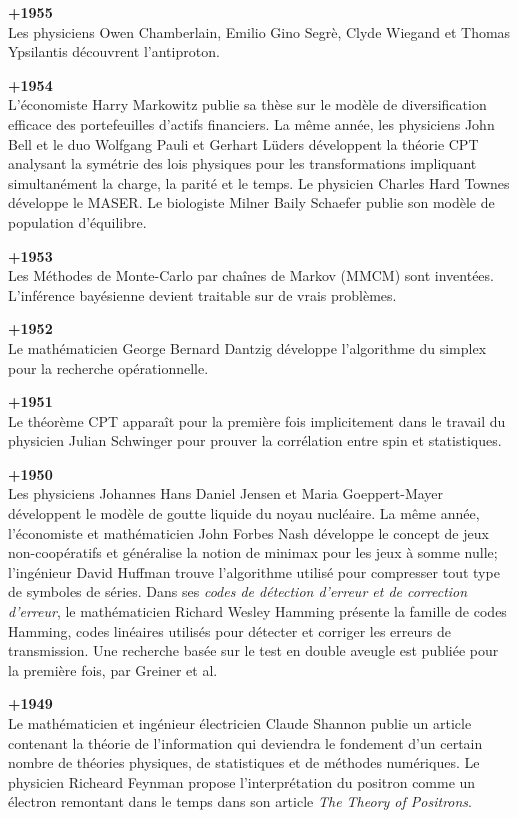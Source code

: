 \textbf{+1955}\\
Les physiciens Owen Chamberlain, Emilio Gino Segrè, Clyde Wiegand et Thomas Ypsilantis découvrent l'antiproton.

\textbf{+1954}\\
L'économiste Harry Markowitz publie sa thèse sur le modèle de diversification efficace des portefeuilles d'actifs financiers. La même année, les physiciens John Bell et le duo Wolfgang Pauli et Gerhart Lüders développent la théorie CPT analysant la symétrie des lois physiques pour les transformations impliquant simultanément la charge, la parité et le temps. Le physicien Charles Hard Townes développe le MASER. Le biologiste Milner Baily Schaefer publie son modèle de population d'équilibre.

\textbf{+1953}\\
Les Méthodes de Monte-Carlo par chaînes de Markov (MMCM) sont inventées. L'inférence bayésienne devient traitable sur de vrais problèmes.


\textbf{+1952}\\
Le mathématicien George Bernard Dantzig développe l'algorithme du simplex pour la recherche opérationnelle.

\textbf{+1951}\\
Le théorème CPT apparaît pour la première fois implicitement dans le travail du physicien Julian Schwinger pour prouver la corrélation entre spin et statistiques.

\textbf{+1950}\\
Les physiciens Johannes Hans Daniel Jensen et Maria Goeppert-Mayer développent le modèle de goutte liquide du noyau nucléaire. La même année, l'économiste et mathématicien John Forbes Nash développe le concept de jeux non-coopératifs et généralise la notion de minimax pour les jeux à somme nulle; l'ingénieur David Huffman trouve l'algorithme utilisé pour compresser tout type de symboles de séries. Dans ses \textit{codes de détection d'erreur et de correction d'erreur}, le mathématicien Richard Wesley Hamming présente la famille de codes Hamming, codes linéaires utilisés pour détecter et corriger les erreurs de transmission. Une recherche basée sur le test en double aveugle est publiée pour la première fois, par Greiner et al.

\textbf{+1949}\\
Le mathématicien et ingénieur électricien Claude Shannon publie un article contenant la théorie de l'information qui deviendra le fondement d'un certain nombre de théories physiques, de statistiques et de méthodes numériques. Le physicien Richeard Feynman propose l'interprétation du positron comme un électron remontant dans le temps dans son article \textit{The Theory of Positrons}.

